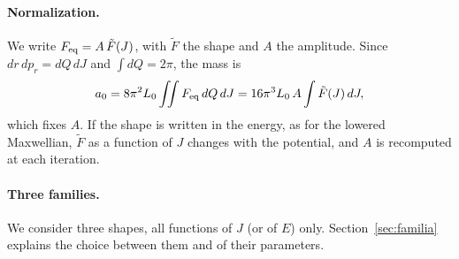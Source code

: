 \documentclass[11pt,a4paper]{article}
\begin{document}
\paragraph{Normalization.} We write $F_{\rm eq}=A\,\tilde F(J)$, with $\tilde F$ the shape and $A$
the amplitude. Since $dr\,dp_r=dQ\,dJ$ and $\int dQ=2\pi$, the mass is
\[
  a_0 = 8\pi^2L_0\iint F_{\rm eq}\,dQ\,dJ = 16\pi^3L_0\,A\int\tilde F(J)\,dJ ,
\]
which fixes $A$. If the shape is written in the energy, as for the lowered Maxwellian,
$\tilde F$ as a function of $J$ changes with the potential, and $A$ is recomputed at each
iteration.

\paragraph{Three families.} We consider three shapes, all functions of $J$ (or of $E$)
only. Section~\ref{sec:familia} explains the choice between them and of their
parameters.
\end{document}
